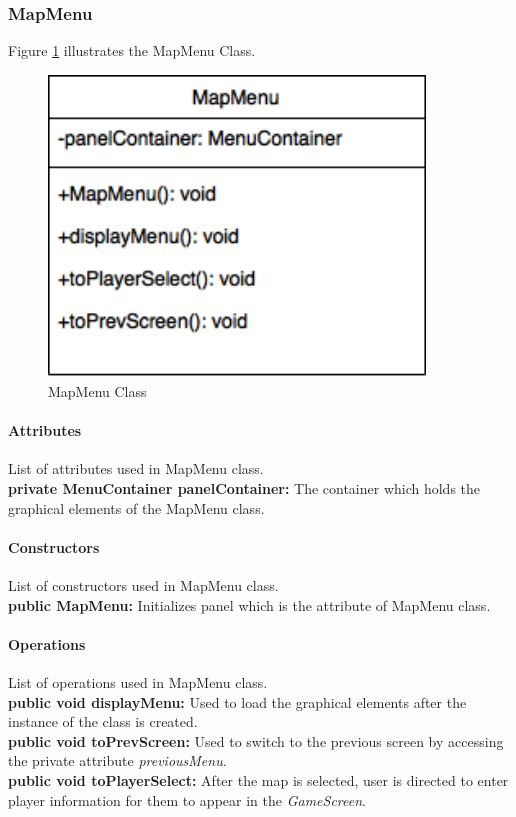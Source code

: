 \documentclass[12pt]{article} %
\begin{document}


\subsubsection{MapMenu} %

Figure \ref{fig:mapmenu} illustrates the MapMenu Class.
\begin{figure}[h!]
   \centering
   \vspace{10pt}%
   \includegraphics[width=10cm]{mapmenu.png}
   \caption{MapMenu Class}
   \label{fig:mapmenu}
\end{figure}

\paragraph{Attributes \\}

List of attributes used in MapMenu class.\\
\textbf{private MenuContainer panelContainer:} The container which holds the graphical elements of the MapMenu class. 

\paragraph{Constructors \\}
List of constructors used in MapMenu class.\\
\textbf{public MapMenu:} Initializes panel which is the attribute of MapMenu class.


\paragraph{Operations \\}
List of operations used in MapMenu class.\\
\textbf{public void displayMenu:} Used to load the graphical elements after the instance of the class is created.\\
\textbf{public void toPrevScreen:} Used to switch to the previous screen by accessing the private attribute \textit{previousMenu}.\\
\textbf{public void toPlayerSelect:} After the map is selected, user is directed to enter player information for them to appear in the \textit{GameScreen}.
\end{document}
